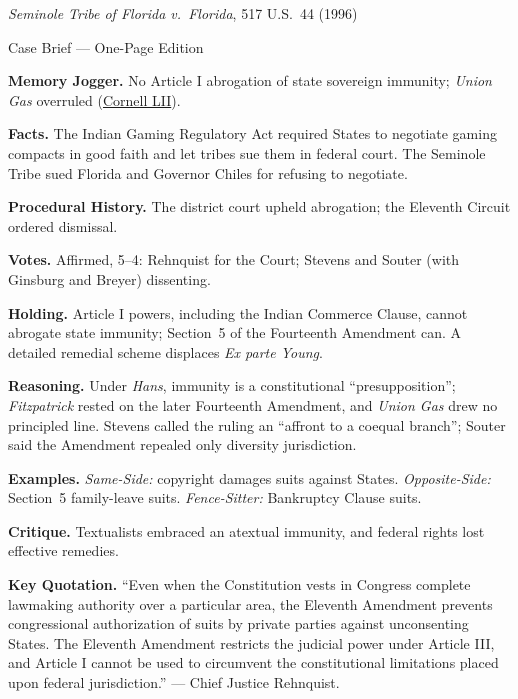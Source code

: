 \documentclass[12pt]{article}
\begin{document}
\begin{center}
{\Large \textit{Seminole Tribe of Florida v.\ Florida}, 517 U.S.\ 44 (1996)\par}
\vspace{0.3em}
{\normalsize Case Brief --- One-Page Edition\par}
\end{center}

\textbf{Memory Jogger.} No Article I abrogation of state sovereign immunity; \textit{Union Gas} overruled (\href{https://www.law.cornell.edu/supct/html/94-12.ZO.html}{Cornell LII}).

\textbf{Facts.} The Indian Gaming Regulatory Act required States to negotiate gaming compacts in good faith and let tribes sue them in federal court. The Seminole Tribe sued Florida and Governor Chiles for refusing to negotiate.

\textbf{Procedural History.} The district court upheld abrogation; the Eleventh Circuit ordered dismissal.

\textbf{Votes.} Affirmed, 5--4: Rehnquist for the Court; Stevens and Souter (with Ginsburg and Breyer) dissenting.

\textbf{Holding.} Article I powers, including the Indian Commerce Clause, cannot abrogate state immunity; Section~5 of the Fourteenth Amendment can. A detailed remedial scheme displaces \textit{Ex parte Young}.

\textbf{Reasoning.} Under \textit{Hans}, immunity is a constitutional ``presupposition''; \textit{Fitzpatrick} rested on the later Fourteenth Amendment, and \textit{Union Gas} drew no principled line. Stevens called the ruling an ``affront to a coequal branch''; Souter said the Amendment repealed only diversity jurisdiction.

\textbf{Examples.} \emph{Same-Side:} copyright damages suits against States. \emph{Opposite-Side:} Section~5 family-leave suits. \emph{Fence-Sitter:} Bankruptcy Clause suits.

\textbf{Critique.} Textualists embraced an atextual immunity, and federal rights lost effective remedies.

\textbf{Key Quotation.} ``Even when the Constitution vests in Congress complete lawmaking authority over a particular area, the Eleventh Amendment prevents congressional authorization of suits by private parties against unconsenting States. The Eleventh Amendment restricts the judicial power under Article III, and Article I cannot be used to circumvent the constitutional limitations placed upon federal jurisdiction.'' --- Chief Justice Rehnquist.
\end{document}
